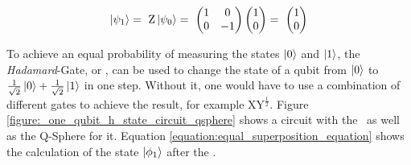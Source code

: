 \begin{equation}
    \centering
    \begin{split}
        \ket{\psi_1} =\ \mathrm{Z}\ket{\psi_0} =\ \begin{pmatrix} 1 & 0\\ 0 & -1\end{pmatrix}\begin{pmatrix}1 \\ 0\end{pmatrix} =\ \begin{pmatrix}1 \\ 0\end{pmatrix}\\
    \end{split}
    \label{equation:state_z_equation}
\end{equation}

To achieve an equal probability of measuring the states $\ket{0}$ and $\ket{1}$, the \emph{Hadamard}-Gate, or \hgate\cite{qiskit_hgate_nodate}, can be used to change the state of a qubit from $\ket{0}$ to $\frac{1}{\sqrt{2}}\ket{0} + \frac{1}{\sqrt{2}}\ket{1}$ in one step. Without it, one would have to use a combination of different gates to achieve the result\cite{voorhoede_hadamard_nodate}, for example $\mathrm{XY}^{\frac{1}{2}}$. Figure \ref{figure:_one_qubit_h_state_circuit_qsphere} shows a circuit with the \hgate\ as well as the Q-Sphere for it. Equation \ref{equation:equal_superposition_equation} shows the calculation of the state $\ket{\phi_1}$ after the \hgate.


